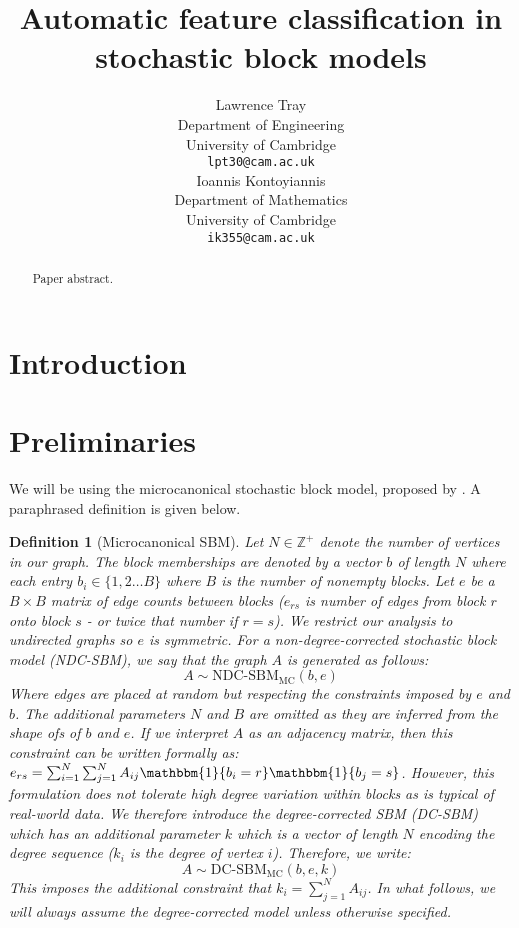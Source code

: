 \documentclass{article}
\title{Automatic feature classification in stochastic block models}
\author{
  Lawrence Tray \\
  Department of Engineering \\
  University of Cambridge \\
  \texttt{lpt30@cam.ac.uk} \\
  \And
  Ioannis Kontoyiannis \\
  Department of Mathematics \\
  University of Cambridge \\
  \texttt{ik355@cam.ac.uk}
}
\newcommand{\Integers}{\mathbb{Z}}
\newcommand{\one}{\mathbbm{1}}
\newtheorem{definition}{Definition}[section]
\begin{document}
\maketitle

\begin{abstract}
  Paper abstract.
\end{abstract}


\section{Introduction}


\section{Preliminaries}

We will be using the microcanonical stochastic block model, proposed by \cite{Peixoto-Bayesian-Microcanonical}. A paraphrased definition is given below.

\begin{definition}[Microcanonical SBM]
	\label{defn:microcan-sbm}
	Let $N \in \Integers^{+}$ denote the number of vertices in our graph. The block memberships are denoted by a vector $b$ of length $N$ where each entry $b_i \in \{1, 2 \dots B\}$ where $B$ is the number of nonempty blocks. Let $e$ be a $B \times B$ matrix of edge counts between blocks ($e_{rs}$ is number of edges from block $r$ onto block $s$ - or twice that number if $r=s$). We restrict our analysis to undirected graphs so $e$ is symmetric. For a non-degree-corrected stochastic block model (NDC-SBM), we say that the graph $A$ is generated as follows:
	\begin{equation}
		A \sim \textrm{NDC-SBM}_{\textrm{MC}} (b, e)
	\end{equation}
	Where edges are placed at random but respecting the constraints imposed by $e$ and $b$. The additional parameters $N$ and $B$ are omitted as they are inferred from the shape ofs of $b$ and $e$. If we interpret $A$ as an adjacency matrix, then this constraint can be written formally as: $e_{rs} = \sum_{i=1}^{N} \sum_{j=1}^{N} A_{ij} \one \{b_i = r\} \one \{b_j = s\}$. However, this formulation does not tolerate high degree variation within blocks as is typical of real-world data. We therefore introduce the degree-corrected SBM (DC-SBM) which has an additional parameter $k$ which is a vector of length $N$ encoding the degree sequence ($k_i$ is the degree of vertex $i$). Therefore, we write:
	\begin{equation}
		A \sim \textrm{DC-SBM}_{\textrm{MC}} (b, e, k)
	\end{equation}
	This imposes the additional constraint that $k_i = \sum_{j=1}^{N} A_{ij}$. In what follows, we will always assume the degree-corrected model unless otherwise specified.
	
\end{definition}
\end{document}
